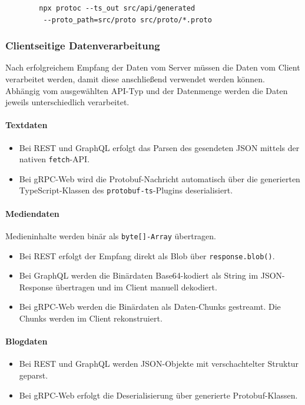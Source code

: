 \begin{enumerate}
	\begin{verbatim}
		npx protoc --ts_out src/api/generated
		 --proto_path=src/proto src/proto/*.proto
	\end{verbatim}
	
	\subsubsection*{Clientseitige Datenverarbeitung}
	Nach erfolgreichem Empfang der Daten vom Server müssen die Daten vom Client verarbeitet werden, damit diese anschließend verwendet werden können. Abhängig vom ausgewählten API-Typ und der Datenmenge werden die Daten jeweils unterschiedlich verarbeitet. 
	
	\paragraph{Textdaten}
	\begin{itemize}
		\item Bei REST und GraphQL erfolgt das Parsen des gesendeten JSON mittels der nativen \texttt{fetch}-API.
		\item Bei gRPC-Web wird die Protobuf-Nachricht automatisch über die generierten TypeScript-Klassen des \texttt{protobuf-ts}-Plugins deserialisiert.
	\end{itemize}
	
	\paragraph{Mediendaten}
	
	Medieninhalte werden binär als \texttt{byte[]-Array} übertragen.
	\begin{itemize}
		\item Bei REST erfolgt der Empfang direkt als Blob über \texttt{response.blob()}.
		\item Bei GraphQL werden die Binärdaten Base64-kodiert als String im JSON-Response übertragen und im Client manuell dekodiert.
		\item Bei gRPC-Web werden die Binärdaten als Daten-Chunks gestreamt. Die Chunks werden im Client rekonstruiert.
	\end{itemize}
	
	\paragraph{Blogdaten}
	\begin{itemize}
		\item Bei REST und GraphQL werden JSON-Objekte mit verschachtelter Struktur geparst.
		\item Bei gRPC-Web erfolgt die Deserialisierung über generierte Protobuf-Klassen.
	\end{itemize}
	

\end{enumerate}
